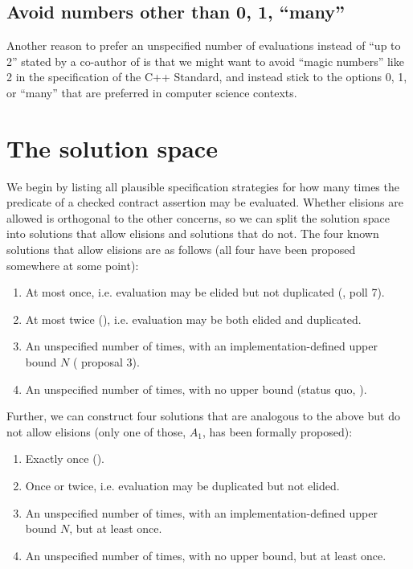 \subsection{Avoid numbers other than 0, 1, ``many''}
\label{subsec:01many}

Another reason to prefer an unspecified number of evaluations instead of ``up to 2'' stated by a co-author of  is that we might want to avoid ``magic numbers'' like 2 in the specification of the C++ Standard, and instead stick to the options 0, 1, or ``many'' that are preferred in computer science contexts.


\section{The solution space}
\label{sec:prepost}

We begin by listing all plausible specification strategies for how many times the predicate of a checked contract assertion may be evaluated. Whether elisions are allowed is orthogonal to the other concerns, so we can split the solution space into solutions that allow elisions and solutions that do not. The four known solutions that allow elisions are as follows (all four have been proposed somewhere at some point):

\renewcommand{\theenumi}{$\Alph{enumi}_0$} \begin{enumerate}
\item At most once, i.e. evaluation may be elided but not duplicated (\cite{P1670R0}, \cite{D3197R0} poll 7).
\item At most twice (\cite{P2521R5}), i.e. evaluation may be both elided and duplicated.
\item An unspecified number of times, with an implementation-defined upper bound $N$ (\cite{P3119R0} proposal 3).
\item An unspecified number of times, with no upper bound (status quo, \cite{P2900R6}).
\end{enumerate}
Further, we can construct four solutions that are analogous to the above but do not allow elisions (only one of those, $A_1$, has been formally proposed):
\renewcommand{\theenumi}{$\Alph{enumi}_1$} \begin{enumerate}
\item Exactly once (\cite{P2756R0}).
\item Once or twice, i.e. evaluation may be duplicated but not elided.
\item An unspecified number of times, with an implementation-defined upper bound $N$, but at least once.
\item An unspecified number of times, with no upper bound, but at least once.
\end{enumerate}

